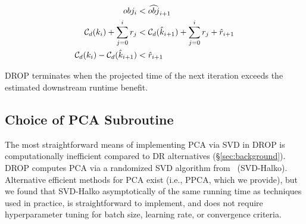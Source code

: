 \vspace{-.4cm}
\begin{align}
  obj_i &< \widehat{obj}_{i+1} \nonumber \\
  \mathcal{C}_{\color{black}d}(k_i) + \sum_{j=0}^i r_j &< \mathcal{C}_{\color{black}d}(\hat{k}_{i+1}) + \sum_{j=0}^{i} r_j + \hat{r}_{i+1} \nonumber \\
  \mathcal{C}_{\color{black}d}(k_i) - \mathcal{C}_{\color{black}d}(\hat{k}_{i+1}) &< \hat{r}_{i+1}  \label{eq:check}
\end{align}

DROP terminates when the projected time of the next iteration exceeds the estimated downstream runtime benefit. 

\subsection{Choice of PCA Subroutine}
\label{subsec:pcaroutine}

The most straightforward means of implementing PCA via SVD in DROP is computationally inefficient compared to DR alternatives (\S\ref{sec:background}).  
DROP computes PCA via a randomized SVD algorithm from~\cite{tropp} (SVD-Halko).
Alternative efficient methods for PCA exist (i.e., PPCA, which we provide), but we found that SVD-Halko asymptotically of the same running time as techniques used in practice, is straightforward to implement, and does not require hyperparameter tuning for batch size, learning rate, or convergence criteria.  

